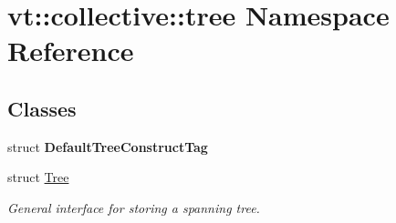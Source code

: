 \hypertarget{namespacevt_1_1collective_1_1tree}{}\section{vt\+:\+:collective\+:\+:tree Namespace Reference}
\label{namespacevt_1_1collective_1_1tree}
\subsection*{Classes}
\begin{DoxyCompactItemize}
\item 
struct {\bfseries Default\+Tree\+Construct\+Tag}
\item 
struct \hyperlink{structvt_1_1collective_1_1tree_1_1_tree}{Tree}
\begin{DoxyCompactList}\small\item\em General interface for storing a spanning tree. \end{DoxyCompactList}\end{DoxyCompactItemize}
